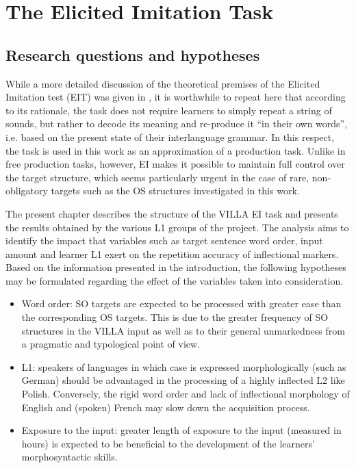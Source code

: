 \chapter{The Elicited Imitation Task}\label{sec:3}

\section{Research questions and hypotheses}\label{sec:04:1}

While a more detailed discussion of the theoretical premises of the Elicited Imitation test (EIT) was given in , it is worthwhile to repeat here that according to its rationale, the task does not require learners to simply repeat a string of sounds, but rather to decode its meaning and re-produce it ``in their own words'', i.e. based on the present state of their interlanguage grammar. In this respect, the task is used in this work as an approximation of a production task. Unlike in free production tasks, however, EI makes it possible to maintain full control over the target structure, which seems particularly urgent in the case of rare, non-obligatory targets such as the OS structures investigated in this work.

The present chapter describes the structure of the VILLA EI task and presents the results obtained by the various L1 groups of the project. The analysis aims to identify the impact that variables such as target sentence word order, input amount and learner L1 exert on the repetition accuracy of inflectional markers. Based on the information presented in the introduction, the following hypotheses may be formulated regarding the effect of the variables taken into consideration.

\begin{itemize}
    \item Word order: SO targets are expected to be processed with greater ease than the corresponding OS targets. This is due to the greater frequency of SO structures in the VILLA input as well as to their general unmarkedness from a pragmatic and typological point of view.
    \item L1: speakers of languages in which case is expressed morphologically (such as German) should be advantaged in the processing of a highly inflected L2 like Polish. Conversely, the rigid word order and lack of inflectional morphology of English and (spoken) French may slow down the acquisition process.
    \item Exposure to the input: greater length of exposure to the input (measured in hours) is expected to be beneficial to the development of the learners’ morphosyntactic skills.
\end{itemize}

